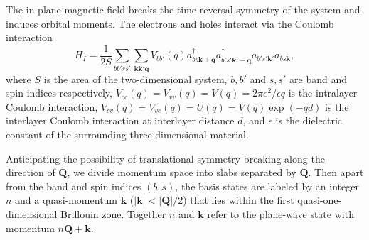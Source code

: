 \documentclass[reprint,aps,superscriptaddress]{revtex4-2}
\begin{document}
The in-plane magnetic field breaks the time-reversal symmetry of the system and 
induces orbital moments.  The electrons and holes interact via the Coulomb interaction
\begin{equation}
H_I = \frac{1}{2S}\sum_{bb'ss'}\sum_{\bm{kk'q}} V_{bb'}(q) a_{bs\bm k+\bm q}^{\dagger} a_{b's'\bm k'-\bm q}^{\dagger} a_{b's'\bm k'} a_{bs\bm k},
\end{equation}
where $S$ is the area of the two-dimensional system, $b,b'$ and $s,s'$ are band and spin indices respectively, $V_{cc}(q)=V_{vv}(q)=V(q)=2\pi e^2/\epsilon q$ is the intralayer Coulomb interaction, $V_{cv}(q)=V_{vc}(q)=U(q)=V(q)\exp(-qd)$ is the interlayer Coulomb interaction at interlayer distance $d$, and $\epsilon$ is the dielectric constant of the surrounding three-dimensional material.

Anticipating the possibility of translational symmetry breaking \cite{hu2017topological} along the 
direction of $\bm{Q}$, we divide momentum space into slabs separated by $\bm{Q}$. 
Then apart from the band and spin indices $(b,s)$, the basis states are labeled by an integer $n$ and a quasi-momentum $\bm k$ ($|\bm{k}|<|\bm{Q}|/2$) that lies within the first quasi-one-dimensional Brillouin zone.
Together $n$ and $\bm{k}$ refer to the plane-wave state with momentum $n\bm Q+\bm k$.
\end{document}
